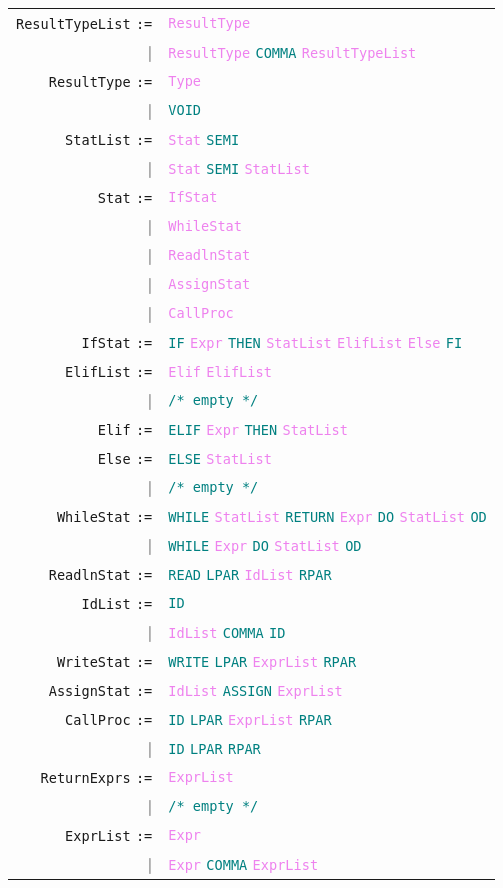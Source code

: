 \documentclass[a4paper,12pt]{article}
\newcommand\nonterm[1]{\texttt{\textcolor{violet}{#1}}}
\newcommand\term[1]{\texttt{\textcolor{teal}{#1}}}
\newcommand\production[1]{\texttt{#1} \texttt{:=}}
\newcommand\emptyprod{\texttt{\textcolor{teal}{/* empty */}}}
\begin{document}
	\begin{tabular}{rl}
	\production{ResultTypeList} & \nonterm{ResultType} \\
						  |& \nonterm{ResultType} \term{COMMA} \nonterm{ResultTypeList} \\
	\production{ResultType}       & \nonterm{Type} \\
						  |& \term{VOID} \\
	\production{StatList} 		   & \nonterm{Stat} \term{SEMI} \\
						  |& \nonterm{Stat} \term{SEMI} \nonterm{StatList} \\
	\production{Stat}                  & \nonterm{IfStat} \\
						  |& \nonterm{WhileStat} \\
						  |& \nonterm{ReadlnStat} \\
						  |& \nonterm{AssignStat} \\
						  |& \nonterm{CallProc} \\
    \production{IfStat}                   & \term{IF} \nonterm{Expr} \term{THEN} \nonterm{StatList} \nonterm{ElifList} \nonterm{Else} \term{FI} \\
    \production{ElifList}                 & \nonterm{Elif} \nonterm{ElifList} \\
    						|& \emptyprod \\
   \production{Elif}			 & \term{ELIF} \nonterm{Expr} \term{THEN} \nonterm{StatList} \\
   \production{Else}   			 & \term{ELSE} \nonterm{StatList} \\
   						|& \emptyprod \\
   \production{WhileStat} & \term{WHILE} \nonterm{StatList} \term{RETURN} \nonterm{Expr} \term{DO} \nonterm{StatList} \term{OD} \\
   						 |& \term{WHILE} \nonterm{Expr} \term{DO} \nonterm{StatList} \term{OD} \\
  \production{ReadlnStat}           & \term{READ} \term{LPAR} \nonterm{IdList} \term{RPAR} \\
  \production{IdList}                    & \term{ID} \\
					        |& \nonterm{IdList} \term{COMMA} \term{ID} \\
  \production{WriteStat}              & \term{WRITE} \term{LPAR} \nonterm{ExprList} \term{RPAR} \\
  \production{AssignStat}           & \nonterm{IdList} \term{ASSIGN} \nonterm{ExprList} \\
  \production{CallProc}         & \term{ID} \term{LPAR} \nonterm{ExprList} \term{RPAR} \\
						|& \term{ID} \term{LPAR} \term{RPAR} \\
  \production{ReturnExprs}    & \nonterm{ExprList} \\
						 |& \emptyprod \\
	\production{ExprList}           & \nonterm{Expr} \\
						 |& \nonterm{Expr} \term{COMMA} \nonterm{ExprList} \\
   \end{tabular}
\end{document}
